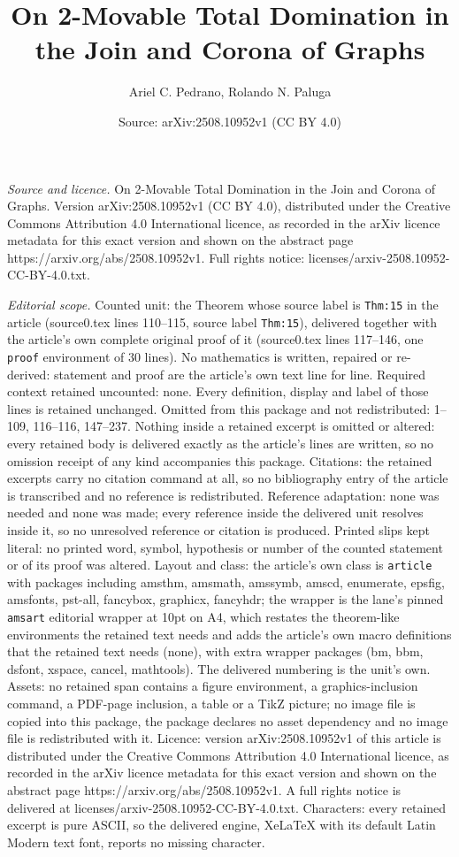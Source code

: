 \documentclass[10pt,a4paper]{amsart}
\title[On 2-Movable Total Domination in the Join and Corona of Grap]{On 2-Movable Total Domination in the Join and Corona of Graphs}
\author{Ariel C. Pedrano, Rolando N. Paluga}
\date{Source: arXiv:2508.10952v1 (CC BY 4.0)}
\begin{document}
\maketitle

\noindent\emph{Source and licence.} On 2-Movable Total Domination in the Join and Corona of Graphs. Version arXiv:2508.10952v1 (CC BY 4.0), distributed under the Creative Commons Attribution 4.0 International licence, as recorded in the arXiv licence metadata for this exact version and shown on the abstract page https://arxiv.org/abs/2508.10952v1. Full rights notice: licenses/arxiv-2508.10952-CC-BY-4.0.txt.\par\smallskip

\noindent\textit{Editorial scope.} Counted unit: the Theorem whose source label is \texttt{Thm:15} in the article (source0.tex lines 110--115, source label \texttt{Thm:15}), delivered together with the article's own complete original proof of it (source0.tex lines 117--146, one \texttt{proof} environment of 30 lines). No mathematics is written, repaired or re-derived: statement and proof are the article's own text line for line. Required context retained uncounted: none. Every definition, display and label of those lines is retained unchanged. Omitted from this package and not redistributed: 1--109, 116--116, 147--237. Nothing inside a retained excerpt is omitted or altered: every retained body is delivered exactly as the article's lines are written, so no omission receipt of any kind accompanies this package. Citations: the retained excerpts carry no citation command at all, so no bibliography entry of the article is transcribed and no reference is redistributed. Reference adaptation: none was needed and none was made; every reference inside the delivered unit resolves inside it, so no unresolved reference or citation is produced. Printed slips kept literal: no printed word, symbol, hypothesis or number of the counted statement or of its proof was altered. Layout and class: the article's own class is \texttt{article} with packages including amsthm, amsmath, amssymb, amscd, enumerate, epsfig, amsfonts, pst-all, fancybox, graphicx, fancyhdr; the wrapper is the lane's pinned \texttt{amsart} editorial wrapper at 10pt on A4, which restates the theorem-like environments the retained text needs and adds the article's own macro definitions that the retained text needs (none), with extra wrapper packages (bm, bbm, dsfont, xspace, cancel, mathtools). The delivered numbering is the unit's own. Assets: no retained span contains a figure environment, a graphics-inclusion command, a PDF-page inclusion, a table or a TikZ picture; no image file is copied into this package, the package declares no asset dependency and no image file is redistributed with it. Licence: version arXiv:2508.10952v1 of this article is distributed under the Creative Commons Attribution 4.0 International licence, as recorded in the arXiv licence metadata for this exact version and shown on the abstract page https://arxiv.org/abs/2508.10952v1. A full rights notice is delivered at licenses/arxiv-2508.10952-CC-BY-4.0.txt. Characters: every retained excerpt is pure ASCII, so the delivered engine, XeLaTeX with its default Latin Modern text font, reports no missing character.
\end{document}
